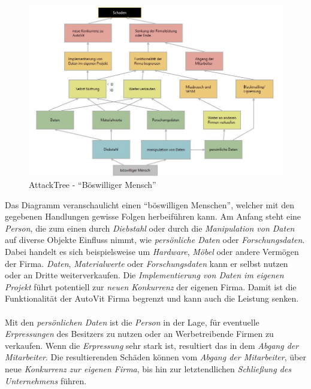 \begin{figure}[h]
\includegraphics[scale=0.8, angle=90]{images/attacktree_boesermensch.jpg} 
\caption{AttackTree - "`Böswilliger Mensch"'}
\end{figure}

Das Diagramm veranschaulicht einen "`böswilligen Menschen"', welcher mit den gegebenen Handlungen gewisse Folgen herbeiführen kann. Am Anfang steht eine \textit{Person}, die zum einen durch \textit{Diebstahl} oder durch die \textit{Manipulation von Daten} auf diverse Objekte Einfluss nimmt, wie \textit{persönliche Daten} oder \textit{Forschungsdaten}. Dabei handelt es sich beispielsweise um \textit{Hardware}, \textit{Möbel} oder andere Vermögen der Firma. \textit{Daten}, \textit{Materialwerte} oder \textit{Forschungsdaten} kann er selbst nutzen oder an Dritte weiterverkaufen. Die \textit{Implementierung von Daten im eigenen Projekt} führt potentiell zur \textit{neuen Konkurrenz} der eigenen Firma. Damit ist die Funktionalität der AutoVit Firma begrenzt und kann auch die Leistung senken.
\\
\\
Mit den \textit{persönlichen Daten} ist die \textit{Person} in der Lage, für eventuelle \textit{Erpressungen} des Besitzers zu nutzen oder an Werbetreibende Firmen zu verkaufen. Wenn die \textit{Erpressung} sehr stark ist, resultiert das in dem \textit{Abgang der Mitarbeiter}. Die resultierenden Schäden können vom \textit{Abgang der Mitarbeiter}, über neue \textit{Konkurrenz zur eigenen Firma}, bis hin zur letztendlichen \textit{Schließung des Unternehmens} führen.

